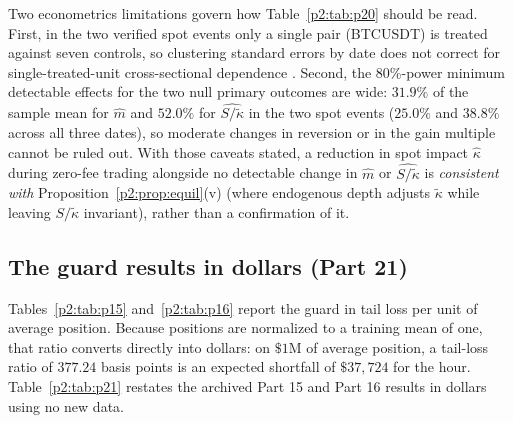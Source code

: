 Two econometrics limitations govern how Table~\ref{p2:tab:p20} should be read. First, in the two verified spot events only a single pair (BTCUSDT) is treated against seven controls, so clustering standard errors by date does not correct for single-treated-unit cross-sectional dependence \citep{p2:conley2011}. Second, the 80\%-power minimum detectable effects for the two null primary outcomes are wide: $31.9\%$ of the sample mean for $\hat m$ and $52.0\%$ for $\widehat{S/\tilde\kappa}$ in the two spot events ($25.0\%$ and $38.8\%$ across all three dates), so moderate changes in reversion or in the gain multiple cannot be ruled out. With those caveats stated, a reduction in spot impact $\hat\kappa$ during zero-fee trading alongside no detectable change in $\hat m$ or $\widehat{S/\tilde\kappa}$ is \emph{consistent with} Proposition~\ref{p2:prop:equil}(v) (where endogenous depth adjusts $\tilde\kappa$ while leaving $S/\tilde\kappa$ invariant), rather than a confirmation of it.

\subsection{The guard results in dollars (Part 21)}\label{p2:sec:p21}
Tables~\ref{p2:tab:p15} and~\ref{p2:tab:p16} report the guard in tail loss per unit of average position. Because positions are normalized to a training mean of one, that ratio converts directly into dollars: on $\$1$M of average position, a tail-loss ratio of $377.24$ basis points is an expected shortfall of $\$37{,}724$ for the hour. Table~\ref{p2:tab:p21} restates the archived Part 15 and Part 16 results in dollars using no new data.

